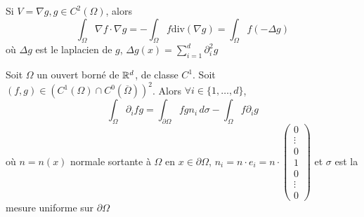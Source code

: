 \documentclass[]{report}
\begin{document}
    \begin{re}{}{}
        Si $V=\nabla g,g\in C^2(\Omega)$, alors
        \[\int_\Omega \nabla f\cdot \nabla g=-\int_\Omega f\text{div}(\nabla g)=\int_\Omega f(-\Delta g)\]
        où $\Delta g$ est le laplacien de $g$, $\Delta g(x)=\sum_{i=1}^{d}\partial_i^2 g$
    \end{re}

    \begin{tm}{}{}
        Soit $\Omega$ un ouvert borné de $\mathbb{R}^d$, de classe $C^1$. Soit $(f,g)\in (C^1(\Omega)\cap C^0(\overline{\Omega}))^2$. Alors $\forall i\in \{1,\ldots,d\}$,
        \[\int_\Omega \partial_i fg=\int_{\partial \Omega}fg n_i\, d\sigma-\int_{\Omega}f\partial_i g\]
        où $n=n(x)$ normale sortante à $\Omega$ en $x\in \partial\Omega$, $n_i=n\cdot e_i=n\cdot\left(\begin{matrix}
            0\\
            \vdots\\
            0\\
            1\\
            0\\
            \vdots\\
            0
        \end{matrix}\right)$ et $\sigma$ est la mesure uniforme sur $\partial \Omega$
    \end{tm}
\end{document}
